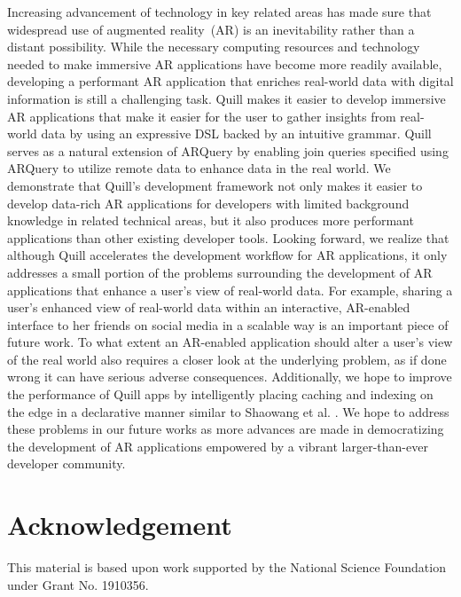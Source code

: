\documentclass[11pt]{article}
\begin{document}
Increasing advancement of technology in key related areas has made sure that widespread use of augmented reality~(AR) is an inevitability rather than a distant possibility. While the necessary computing resources and technology needed to make immersive AR applications have become more readily available, developing a performant AR application that enriches real-world data with digital information is still a challenging task. Quill makes it easier to develop immersive AR applications that make it easier for the user to gather insights from real-world data by using an expressive DSL backed by an intuitive grammar. Quill serves as a natural extension of ARQuery \cite{burley2019arquery} by enabling join queries specified using ARQuery to utilize remote data to enhance data in the real world. We demonstrate that Quill's development framework not only makes it easier to develop data-rich AR applications for developers with limited background knowledge in related technical areas, but it also produces more performant applications than other existing developer tools. Looking forward, we realize that although Quill accelerates the development workflow for AR applications, it only addresses a small portion of the problems surrounding the development of AR applications that enhance a user's view of real-world data.
For example, sharing a user's enhanced view of real-world data within an interactive, AR-enabled interface to her friends on social media in a scalable way is an important piece of future work. To what extent an AR-enabled application should alter a user's view of the real world also requires a closer look at the underlying problem, as if done wrong it can have serious adverse consequences.
Additionally, we hope to improve the performance of Quill apps by intelligently placing caching and indexing on the edge in a declarative manner similar to Shaowang et al. \cite{shaowang2021declarative}.
We hope to address these problems in our future works as more advances are made in democratizing the development of AR applications empowered by a vibrant larger-than-ever developer community.

\section*{Acknowledgement}
This material is based upon work supported by the National Science Foundation under Grant No. 1910356.
\end{document}
